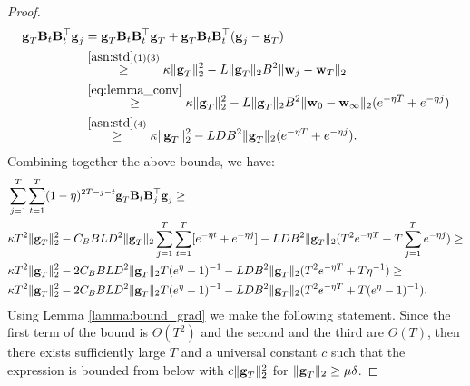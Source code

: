 \begin{proof}
    \begin{align*}
        \boldsymbol{\mathbf{g}}_T\boldsymbol{\mathbf{B}}_t\boldsymbol{\mathbf{B}}_t^\top\boldsymbol{\mathbf{g}}_j &= \boldsymbol{\mathbf{g}}_T\boldsymbol{\mathbf{B}}_t\boldsymbol{\mathbf{B}}_t^\top\boldsymbol{\mathbf{g}}_T + \boldsymbol{\mathbf{g}}_T\boldsymbol{\mathbf{B}}_t\boldsymbol{\mathbf{B}}_t^\top(\boldsymbol{\mathbf{g}}_j - \boldsymbol{\mathbf{g}}_T) \\
        &\stackrel{\ref{asn:std}(1)(3)}{\geq} \kappa\|\boldsymbol{\mathbf{g}}_T\|^2_2 - L\|\boldsymbol{\mathbf{g}}_T\|_2B^2\|\boldsymbol{\mathbf{w}}_j - \boldsymbol{\mathbf{w}}_T\|_2 \\
        &\stackrel{\eqref{eq:lemma_conv}}{\geq} \kappa\|\boldsymbol{\mathbf{g}}_T\|^2_2 - L\|\boldsymbol{\mathbf{g}}_T\|_2B^2\|\boldsymbol{\mathbf{w}}_0 - \boldsymbol{\mathbf{w}}_\infty\|_2(e^{-\eta T} + e^{-\eta j}) \\
        &\stackrel{\ref{asn:std}(4)}{\geq}\kappa\|\boldsymbol{\mathbf{g}}_T\|^2_2 - LDB^2\|\boldsymbol{\mathbf{g}}_T\|_2(e^{-\eta T} + e^{-\eta j}).
    \end{align*}
    Combining together the above bounds, we have:
    \begin{align*}
        &\sum_{j=1}^T\sum_{t=1}^T(1 - \eta)^{2T - j - t}\boldsymbol{\mathbf{g}}_T\boldsymbol{\mathbf{B}}_t\boldsymbol{\mathbf{B}}_j^\top\boldsymbol{\mathbf{g}}_j \geq \\
        &\kappa T^2\|\boldsymbol{\mathbf{g}}_T\|^2_2 - C_BBLD^2\|\boldsymbol{\mathbf{g}}_T\|_2\sum_{j=1}^T\sum_{t=1}^T[e^{-\eta t} + e^{-\eta j}] - LDB^2\|\boldsymbol{\mathbf{g}}_T\|_2(T^2e^{-\eta T} + T\sum_{j=1}^Te^{-\eta j}) \geq \\
        &\kappa T^2\|\boldsymbol{\mathbf{g}}_T\|^2_2 - 2C_BBLD^2\|\boldsymbol{\mathbf{g}}_T\|_2T(e^\eta - 1)^{-1}- LDB^2\|\boldsymbol{\mathbf{g}}_T\|_2(T^2e^{-\eta T} + T\eta^{-1}) \geq \\
        &\kappa T^2\|\boldsymbol{\mathbf{g}}_T\|^2_2 - 2C_BBLD^2\|\boldsymbol{\mathbf{g}}_T\|_2T(e^\eta - 1)^{-1} - LDB^2\|\boldsymbol{\mathbf{g}}_T\|_2(T^2e^{-\eta T} + T(e^\eta - 1)^{-1}).
    \end{align*}
    Using Lemma \ref{lamma:bound_grad} we make the following statement.
    Since the first term of the bound is $\Theta(T^2)$ and the second and the third are $\Theta(T)$, then there exists sufficiently large $T$ and a universal constant $c$ such that the expression is bounded from below with $c\|\boldsymbol{\mathbf{g}}_T\|^2_2$ for $\|\boldsymbol{\mathbf{g}}_T\|_2 \geq \mu\delta$. 
\end{proof}
